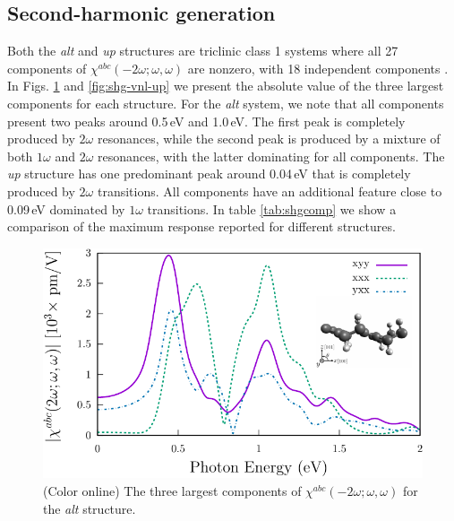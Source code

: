 \documentclass[pss]{wiley2sp} %
\begin{document}
\subsection{Second-harmonic generation}
Both the \emph{alt} and \emph{up} structures are triclinic class 1 systems
where all 27 components of $\chi^{abc}(-2\omega;\omega,\omega)$ are nonzero,
with 18 independent components \cite{popovbook}. In Figs. 
\ref{fig:shg-vnl-alt} and \ref{fig:shg-vnl-up} we present the absolute value
of the three largest components for each structure. For the \emph{alt} system,
we note that all components present two peaks around 0.5\,eV and 1.0\,eV. The
first peak is completely produced by $2\omega$ resonances, while the second
peak is produced by a mixture of both $1\omega$ and $2\omega$ resonances, with
the latter dominating for all components. The \emph{up} structure  has one
predominant peak around 0.04\,eV that is completely produced by $2\omega$
transitions. All components have an additional feature close to 0.09\,eV
dominated by $1\omega$ transitions. In table \ref{tab:shgcomp} we show a
comparison of the maximum response reported for different structures.

\begin{figure}[t]
\includegraphics[width=\linewidth]{figures/shg-vnl-alt}
\caption{(Color online) The three largest components of
$\chi^{abc}(-2\omega;\omega,\omega)$ for the \emph{alt} structure.
\label{fig:shg-vnl-alt}}
\end{figure}
\end{document}
